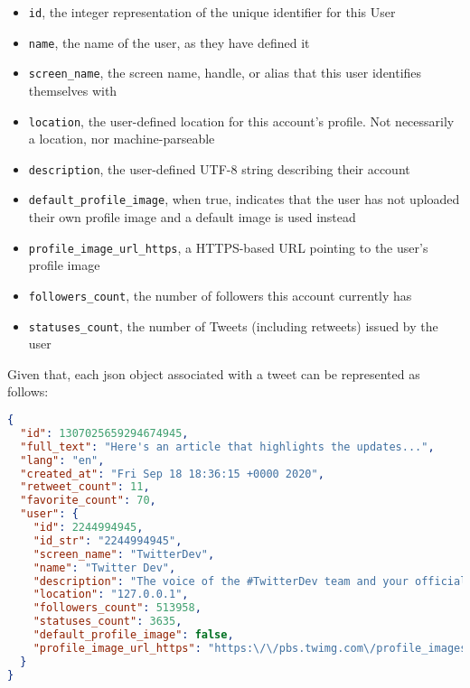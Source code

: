 \begin{itemize}
	\item \texttt{id}, the integer representation of the unique identifier for this User
	\item \texttt{name}, the name of the user, as they have defined it
	\item \texttt{screen\_name}, the screen name, handle, or alias that this user identifies themselves with
	\item \texttt{location}, the user-defined location for this account's profile. Not necessarily a location, nor machine-parseable
	\item \texttt{description}, the user-defined UTF-8 string describing their account
	\item \texttt{default\_profile\_image}, when true, indicates that the user has not uploaded their own profile image and a default image is used instead
	\item \texttt{profile\_image\_url\_https}, a HTTPS-based URL pointing to the user's profile image
	\item \texttt{followers\_count}, the number of followers this account currently has
	\item \texttt{statuses\_count}, the number of Tweets (including retweets) issued by the user
\end{itemize}

Given that, each json object associated with a tweet can be represented as follows:

\begin{lstlisting}[language=json, caption={Final json object for a Tweet}, captionpos=b, label={lst:tweet_json}]
{
  "id": 1307025659294674945,
  "full_text": "Here's an article that highlights the updates...",
  "lang": "en",
  "created_at": "Fri Sep 18 18:36:15 +0000 2020",
  "retweet_count": 11,
  "favorite_count": 70,
  "user": {
    "id": 2244994945,
    "id_str": "2244994945",
    "screen_name": "TwitterDev",
    "name": "Twitter Dev",
    "description": "The voice of the #TwitterDev team and your official...",
    "location": "127.0.0.1",
    "followers_count": 513958,
    "statuses_count": 3635,
    "default_profile_image": false,
    "profile_image_url_https": "https:\/\/pbs.twimg.com\/profile_images\/1283786620521652229\/lEODkLTh_normal.jpg"
  }
}
\end{lstlisting}



